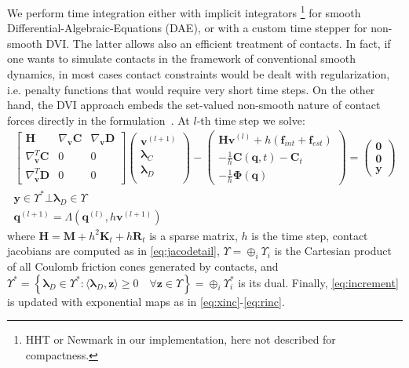 \documentclass[review]{elsarticle}
\def\avect#1{{\boldsymbol{#1}}}
\def\amatr#1{{\boldsymbol{#1}}}
\begin{document}
We perform time integration either with implicit integrators \footnote{HHT \cite{JayNegrut2007} or Newmark \cite{negrutGavrea2005} in our implementation, here not described for compactness.} for smooth Differential-Algebraic-Equations (DAE), or with a custom time stepper for non-smooth DVI.
The latter allows also an efficient treatment of contacts. In fact, if one wants to simulate contacts in the framework of conventional smooth dynamics, in most cases contact constraints would be dealt with regularization, i.e. penalty functions that would require very short time steps. On the other hand, the DVI approach embeds the set-valued non-smooth nature of contact forces directly in the formulation~\cite{negrut2018posing}.
At $l$-th time step we solve:
\begin{align}
    \begin{bmatrix}
    \amatr{H} & \nabla_\avect{v}  \avect{C} & \nabla_\avect{v} \avect{D}\\
    \nabla_\avect{v}^T \avect{C} & 0 & 0 \\
    \nabla_\avect{v}^T \avect{D} & 0 & 0 
    \end{bmatrix}
    \begin{pmatrix}
    \avect{v}^{(l+1)} \\
    \avect{\lambda}_C \\
    \avect{\lambda}_D \\
    \end{pmatrix}
    -
    \begin{pmatrix}
    \amatr{H}   \avect{v}^{(l)} + h(\avect{f}_{int}+\avect{f}_{est})\\
    -\frac{1}{h}\avect{C}(\avect{q},t) - \avect{C}_t\\
    -\frac{1}{h}\avect{\Phi}(\avect{q})
    \end{pmatrix}
    = 
    \begin{pmatrix}
    \avect{0}\\
    \avect{0}\\
    \avect{y}
    \end{pmatrix} \label{eq:dvi}
    \\
    \avect{y} \in \Upsilon^* \bot \avect{\lambda}_D \in \Upsilon  \label{eq:complementarity} 
    \\
    \avect{q}^{(l+1)}=\Lambda(\avect{q}^{(l)},h\avect{v}^{(l+1)}) \label{eq:increment}
\end{align}
%
where $\amatr{H}=\amatr{M}+h^2\amatr{K}_t+h\amatr{R}_t$ is a sparse matrix, $h$ is the time step, contact jacobians are computed as in \eqref{eq:jacodetail}, $\Upsilon = \oplus_i \Upsilon_i$ is the Cartesian product of all Coulomb friction cones generated by contacts, and 
$\Upsilon^* = 
\left \{\avect{\lambda}_D \in \Upsilon^*: \langle  \avect{\lambda}_D, \avect{z} \rangle \geq 0 \quad \forall \avect{z}\in \Upsilon  \right \}
= \oplus_i \Upsilon_i^*$ 
is its dual. Finally, \eqref{eq:increment} is updated with exponential maps as in \eqref{eq:xinc}-\eqref{eq:rinc}.
\end{document}
